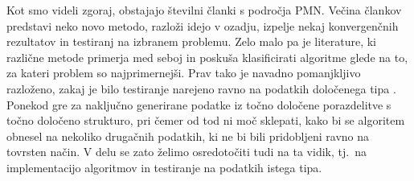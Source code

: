 Kot smo videli zgoraj, obstajajo številni članki s področja PMN. Večina člankov predstavi neko novo metodo, razloži idejo v ozadju, izpelje nekaj konvergenčnih rezultatov in testiranj na izbranem problemu.
Zelo malo pa je literature, ki različne metode primerja med seboj in poskuša klasificirati algoritme glede na to, za kateri problem so najprimernejši. Prav tako je navadno pomanjkljivo razloženo, zakaj je bilo testiranje narejeno ravno na podatkih določenega tipa . Ponekod gre za naključno generirane podatke iz točno določene porazdelitve s točno določeno strukturo, pri čemer od tod ni moč sklepati, kako bi se algoritem obnesel na nekoliko drugačnih podatkih, ki ne bi bili pridobljeni ravno na tovrsten način. V delu se zato želimo osredotočiti tudi na ta vidik, tj.\ na implementacijo algoritmov in testiranje na podatkih istega tipa.
